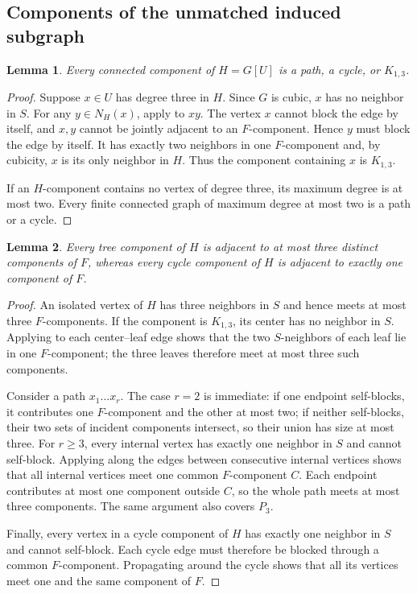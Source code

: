 \documentclass[smallextended,natbib,nospthms]{svjour3}
\newtheorem{lemma}[lemma]{Lemma}
\theoremstyle{definition}
\theoremstyle{remark}
\begin{document}
\subsection{Components of the unmatched induced subgraph}

\begin{lemma}
\label{lem:h-components}
Every connected component of $H=G[U]$ is a path, a cycle, or $K_{1,3}$.
\end{lemma}

\begin{proof}
Suppose $x\in U$ has degree three in $H$. Since $G$ is cubic, $x$ has no
neighbor in $S$. For any $y\in N_H(x)$, apply  to $xy$.
The vertex $x$ cannot block the edge by itself, and $x,y$ cannot be jointly
adjacent to an $F$-component. Hence $y$ must block the edge by itself. It has
exactly two neighbors in one $F$-component and, by cubicity, $x$ is its only
neighbor in $H$. Thus the component containing $x$ is $K_{1,3}$.

If an $H$-component contains no vertex of degree three, its maximum degree is
at most two. Every finite connected graph of maximum degree at most two is a
path or a cycle.
\end{proof}

\begin{lemma}
\label{lem:component-incidence}
Every tree component of $H$ is adjacent to at most three distinct components
of $F$, whereas every cycle component of $H$ is adjacent to exactly one
component of $F$.
\end{lemma}

\begin{proof}
An isolated vertex of $H$ has three neighbors in $S$ and hence meets at most
three $F$-components. If the component is $K_{1,3}$, its center has no
neighbor in $S$. Applying  to each center--leaf edge shows
that the two $S$-neighbors of each leaf lie in one $F$-component; the three
leaves therefore meet at most three such components.

Consider a path $x_1\ldots x_r$. The case $r=2$ is immediate: if one endpoint
self-blocks, it contributes one $F$-component and the other at most two; if
neither self-blocks, their two sets of incident components intersect, so their
union has size at most three. For $r\geq 3$, every internal vertex has exactly
one neighbor in $S$ and cannot self-block. Applying  along
the edges between consecutive internal vertices shows that all internal
vertices meet one common $F$-component $C$. Each endpoint contributes at most
one component outside $C$, so the whole path meets at most three components.
The same argument also covers $P_3$.

Finally, every vertex in a cycle component of $H$ has exactly one neighbor in
$S$ and cannot self-block. Each cycle edge must therefore be blocked through
a common $F$-component. Propagating around the cycle shows that all its
vertices meet one and the same component of $F$.
\end{proof}
\end{document}
